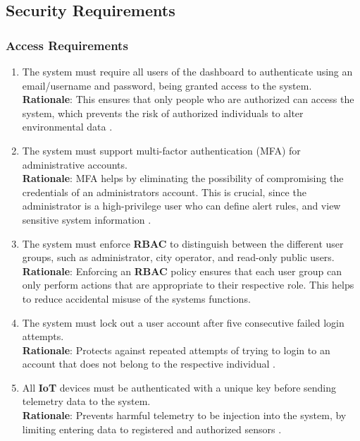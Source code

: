 \documentclass[]{article}
\begin{document}

\subsection{Security Requirements}
\label{sub:security_requirements}

\subsubsection{Access Requirements}
\label{ssub:access_requirements}
\begin{enumerate}[{SR-AC}1. ]
	\item The system must require all users of the dashboard to authenticate using an email/username and password, being granted access to the system. \\
    \textbf{Rationale}: This ensures that only people who are authorized can access the system, which prevents the risk of authorized individuals to alter environmental data \cite{canUserAuth}.

    \item The system must support multi-factor authentication (MFA) for administrative accounts. \\
    \textbf{Rationale}: MFA helps by eliminating the possibility of compromising the credentials of an administrators account. This is crucial, since the administrator is a high-privilege user who can define alert rules, and view sensitive system information \cite{canSecure}.

    \item The system must enforce \textbf{RBAC} to distinguish between the different user groups, such as administrator, city operator, and read-only public users. \\
    \textbf{Rationale}: Enforcing an \textbf{RBAC} policy ensures that each user group can only perform actions that are appropriate to their respective role. This helps to reduce accidental misuse of the systems functions. 

    \item The system must lock out a user account after five consecutive failed login attempts. \\
    \textbf{Rationale}: Protects against repeated attempts of trying to login to an account that does not belong to the respective individual \cite{canUserAuth}.

    \item All \textbf{IoT} devices must be authenticated with a unique key before sending telemetry data to the system. \\
    \textbf{Rationale}: Prevents harmful telemetry to be injection into the system, by limiting entering data to registered and authorized sensors \cite{canIoT}.
\end{enumerate}
\end{document}
